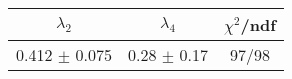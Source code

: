 \begin{tabular}{c|c||c}
$\lambda_{2}$ & $\lambda_4$ & $\chi^{2}$/ndf \\
\hline
0.412 $\pm$ 0.075 & 0.28 $\pm$ 0.17 & 97/98\\
\end{tabular}

